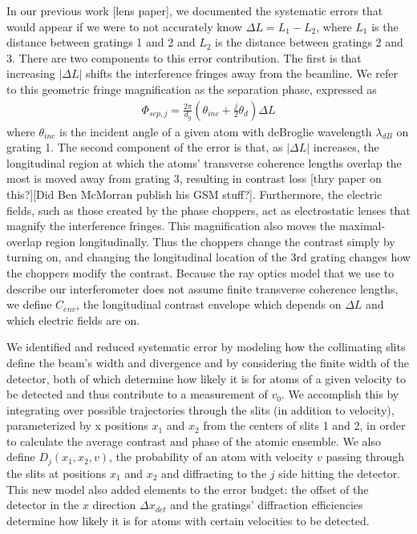 \documentclass[twocolumn, prl,showpacs,superscriptaddress]{revtex4-1}   %
\begin{document}
In our previous work [lens paper], we documented the systematic errors that would appear if we were to not accurately know $\Delta L = L_1 - L_2$, where $L_1$ is the distance between gratings 1 and 2 and $L_2$ is the distance between gratings 2 and 3. There are two components to this error contribution. The first is that increasing $|\Delta L|$ shifts the interference fringes away from the beamline. We refer to this geometric fringe magnification as the separation phase, expressed as
\begin{align}
	\Phi_{sep,j} = \frac{2\pi}{d_g}
	\left(
		\theta_{inc} + \frac{j}{2}\theta_d
	\right) \Delta L
	\label{phiSep}
\end{align}
where $\theta_{inc}$ is the incident angle of a given atom with deBroglie wavelength $\lambda_{dB}$ on grating 1. The second component of the error is that, as $|\Delta L|$ increases, the longitudinal region at which the atoms' transverse coherence lengths overlap the most is moved away from grating 3, resulting in contrast loss [thry paper on this?][Did Ben McMorran publish his GSM stuff?]. Furthermore, the electric fields, such as those created by the phase choppers, act as electrostatic lenses that magnify the interference fringes. This magnification also moves the maximal-overlap region longitudinally. Thus the choppers change the contrast simply by turning on, and changing the longitudinal location of the 3rd grating changes how the choppers modify the contrast. Because the ray optics model that we use to describe our interferometer does not assume finite transverse coherence lengths, we define $C_{env}$, the longitudinal contrast envelope which depends on $\Delta L$ and which electric fields are on.

We identified and reduced systematic error by modeling how the collimating slits define the beam's width and divergence and by considering the finite width of the detector, both of which determine how likely it is for atoms of a given velocity to be detected and thus contribute to a measurement of $v_0$. 
We accomplish this by integrating over possible trajectories through the slits (in addition to velocity), parameterized by x positions $x_1$ and $x_2$ from the centers of slits 1 and 2, in order to calculate the average contrast and phase of the atomic ensemble. We also define $D_j(x_1,x_2,v)$, the probability of an atom with velocity $v$ passing through the slits at positions $x_1$ and $x_2$ and diffracting to the $j$ side hitting the detector.
This new model also added elements to the error budget: the offset of the detector in the $x$ direction $\Delta x_{det}$ and the gratings' diffraction efficiencies determine how likely it is for atoms with certain velocities to be detected.
\end{document}

